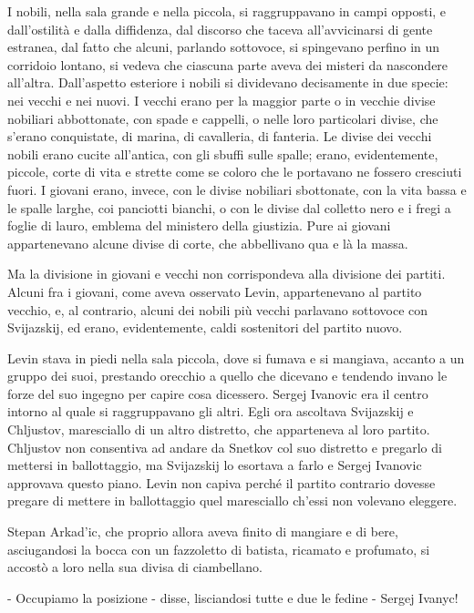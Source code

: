 I nobili, nella sala grande e nella piccola, si raggruppavano in campi opposti, e dall'ostilità e dalla diffidenza, dal discorso che taceva all'avvicinarsi di gente estranea, dal fatto che alcuni, parlando sottovoce, si spingevano perfino in un corridoio lontano, si vedeva che ciascuna parte aveva dei misteri da nascondere all'altra. Dall'aspetto esteriore i nobili si dividevano decisamente in due specie: nei vecchi e nei nuovi. I vecchi erano per la maggior parte o in vecchie divise nobiliari abbottonate, con spade e cappelli, o nelle loro particolari divise, che s'erano conquistate, di marina, di cavalleria, di fanteria. Le divise dei vecchi nobili erano cucite all'antica, con gli sbuffi sulle spalle; erano, evidentemente, piccole, corte di vita e strette come se coloro che le portavano ne fossero cresciuti fuori. I giovani erano, invece, con le divise nobiliari sbottonate, con la vita bassa e le spalle larghe, coi panciotti bianchi, o con le divise dal colletto nero e i fregi a foglie di lauro, emblema del ministero della giustizia. Pure ai giovani appartenevano alcune divise di corte, che abbellivano qua e là la massa. 

Ma la divisione in giovani e vecchi non corrispondeva alla divisione dei partiti. Alcuni fra i giovani, come aveva osservato Levin, appartenevano al partito vecchio, e, al contrario, alcuni dei nobili più vecchi parlavano sottovoce con Svijazskij, ed erano, evidentemente, caldi sostenitori del partito nuovo. 

Levin stava in piedi nella sala piccola, dove si fumava e si mangiava, accanto a un gruppo dei suoi, prestando orecchio a quello che dicevano e tendendo invano le forze del suo ingegno per capire cosa dicessero. Sergej Ivanovic era il centro intorno al quale si raggruppavano gli altri. Egli ora ascoltava Svijazskij e Chljustov, maresciallo di un altro distretto, che apparteneva al loro partito. Chljustov non consentiva ad andare da Snetkov col suo distretto e pregarlo di mettersi in ballottaggio, ma Svijazskij lo esortava a farlo e Sergej Ivanovic approvava questo piano. Levin non capiva perché il partito contrario dovesse pregare di mettere in ballottaggio quel maresciallo ch'essi non volevano eleggere. 

Stepan Arkad'ic, che proprio allora aveva finito di mangiare e di bere, asciugandosi la bocca con un fazzoletto di batista, ricamato e profumato, si accostò a loro nella sua divisa di ciambellano. 

- Occupiamo la posizione - disse, lisciandosi tutte e due le fedine - Sergej Ivanyc! 

